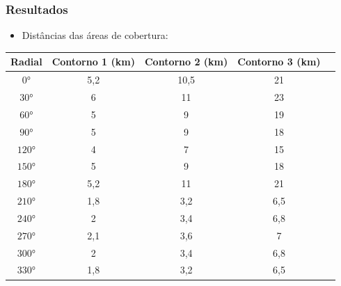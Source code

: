 \documentclass{beamer}
\begin{document}
    
      \begin{frame}
    
      \frametitle{Resultados}
      
      \begin{itemize}
      
      \item Distâncias das áreas de cobertura:
      
      \end{itemize}
      
      \begin{center}
  
	  \def\tablename{Tabela}
	  \begin{table}
	  \vspace*{0.05cm}
	  \centering

	  \begin{tabular}{|c|c|c|c|c|} \hline

	  Radial& Contorno 1 (km) & Contorno 2 (km) & Contorno 3 (km)\\\hline\hline
	  $0°$  &5,2&10,5&21\\\hline
	  $30°$ &6  &11  &23\\\hline
	  $60°$ &5  &9   &19\\\hline
	  $90°$ &5  &9   &18\\\hline
	  $120°$&4  &7   &15\\\hline
	  $150°$&5  &9   &18\\\hline
	  $180°$&5,2&11  &21\\\hline
	  $210°$&1,8&3,2 &6,5\\\hline
	  $240°$&2  &3,4 &6,8\\\hline
	  $270°$&2,1&3,6 &7\\\hline
	  $300°$&2  &3,4 &6,8\\\hline
	  $330°$&1,8&3,2 &6,5\\\hline

	  \end{tabular}
	  \label{tabelaContorno2}
	  \end{table}
	      
    
            \end{center}
      
  \end{frame}
     
\end{document}
